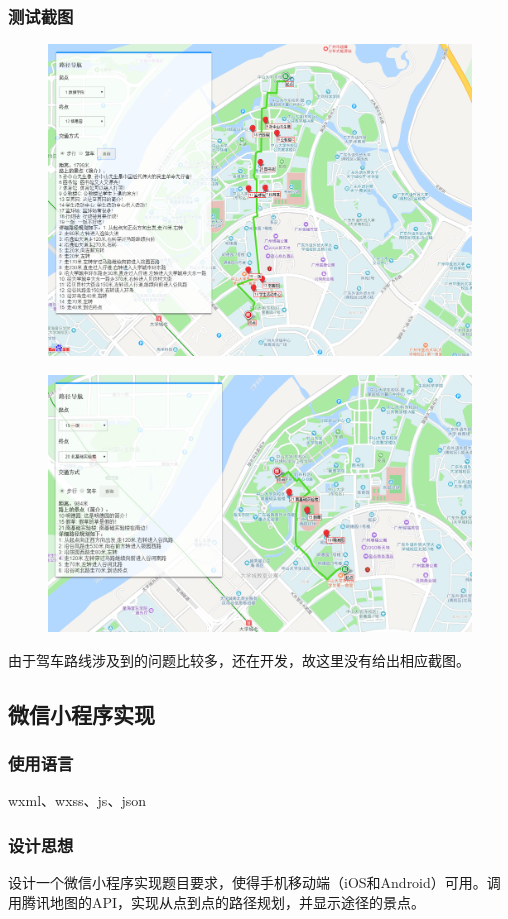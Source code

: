 \documentclass[12pt,UTF8]{ctexart}
\begin{document}
\begin{spacing}{1.4}
\subsubsection{测试截图}
\begin{figure}[H]
\centering
\includegraphics[width=0.8\linewidth]{fig/web1.PNG}
\end{figure}
\begin{figure}[H]
\centering
\includegraphics[width=0.8\linewidth]{fig/web2.PNG}
\end{figure}
由于驾车路线涉及到的问题比较多，还在开发，故这里没有给出相应截图。


\subsection{微信小程序实现}
\subsubsection{使用语言}
wxml、wxss、js、json

\subsubsection{设计思想}
设计一个微信小程序实现题目要求，使得手机移动端（iOS和Android）可用。调用腾讯地图的API，实现从点到点的路径规划，并显示途径的景点。


\end{spacing}
\end{document}
